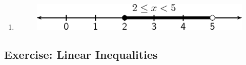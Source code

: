 {\begin{mdframed}[linewidth=4, leftmargin=40, rightmargin=40]
\begin{exercise}
\begin{enumerate}[noitemsep, label=\textbf{Step} \textbf{\arabic*}. ]
      
      \item  
      \label{m39254*id158456}
        
    \setcounter{subfigure}{0}


	\begin{figure}[H] %
    \begin{center}
    \label{m39254*id158459!!!underscore!!!media}\label{m39254*id158459!!!underscore!!!printimage}\includegraphics{col11306.imgs/m39254_MG10C10_005.png} %
        
      \vspace{2pt}
    \vspace{.1in}
    
    \end{center}

 \end{figure}   

    \addtocounter{footnote}{-0}
    
      \par 
      
      \end{enumerate}
         

    \end{exercise}
    \end{mdframed}
    }
    \noindent
 

            \subsection{ Exercise: Linear Inequalities }
            \nopagebreak
            
